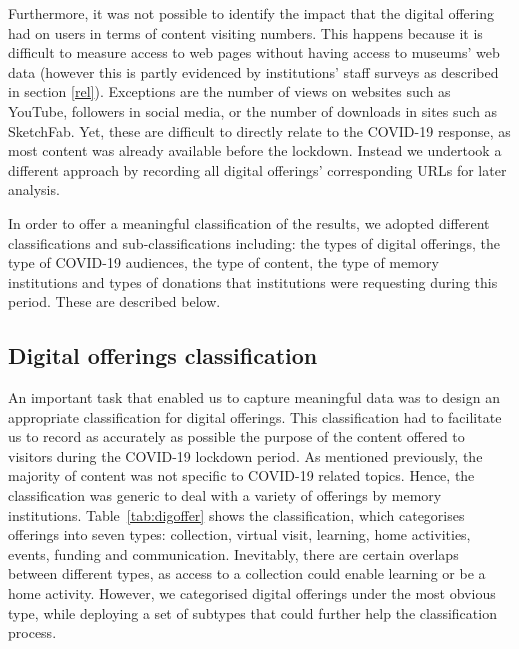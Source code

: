 \documentclass{egpubl}
\begin{document}
Furthermore, it was not possible to identify the impact that the digital offering had on users in terms of content visiting numbers. This happens because it is difficult to measure access to web pages without having access to museums’ web data (however this is partly evidenced by institutions' staff surveys as described in section \ref{rel}). Exceptions are the number of views on websites such as YouTube, followers in social media, or the number of downloads in sites such as SketchFab. Yet, these are difficult to directly relate to the COVID-19 response, as most content was already available before the lockdown. Instead we undertook a different approach by recording all digital offerings' corresponding URLs for later analysis. 

In order to offer a meaningful classification of the results, we adopted different classifications and sub-classifications including: the types of digital offerings, the type of COVID-19 audiences, the type of content, the type of memory institutions and types of donations that institutions were requesting during this period. These are described below.

\subsection{Digital offerings classification}
\label{off}
An important task that enabled us to capture meaningful data was to design an appropriate classification for digital offerings. This classification had to facilitate us to record as accurately as possible the purpose of the content offered to visitors during the COVID-19 lockdown period. As mentioned previously, the majority of content was not specific to COVID-19 related topics. Hence, the classification was generic to deal with a variety of offerings by memory institutions. Table~\ref{tab:digoffer} shows the classification, which categorises offerings into seven types: collection, virtual visit, learning, home activities, events, funding and communication. Inevitably, there are certain overlaps between different types, as access to a collection could enable learning or be a home activity. However, we categorised digital offerings %
under the most obvious type, while deploying a set of subtypes that could further help the classification process.
\end{document}
